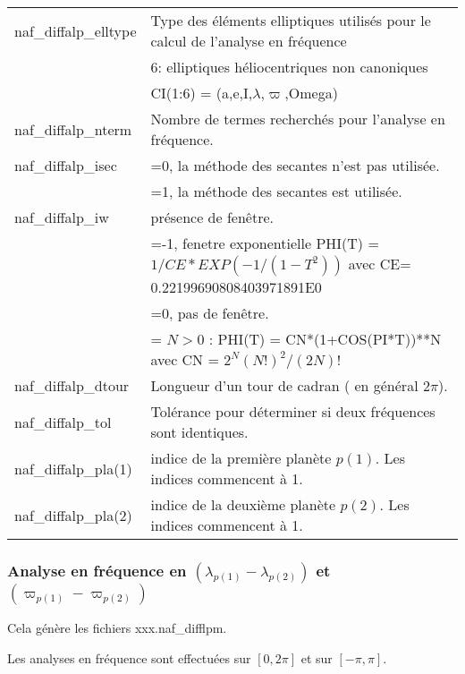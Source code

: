\documentclass[11pt]{article}
\begin{document}
\begin{tabularx}{\textwidth}{|l|X|}
naf\_diffalp\_elltype  & Type des \'el\'ements elliptiques utilis\'es pour le calcul de l'analyse en fr\'equence\\ 
&6:  elliptiques h\'eliocentriques non canoniques\\
&	     CI(1:6) = (a,e,I,$\lambda$,$\varpi$,Omega)\\ \hline
naf\_diffalp\_nterm  & Nombre de termes recherch\'es pour l'analyse en fr\'equence.\\ \hline
naf\_diffalp\_isec  & =0, la m\'ethode des secantes n'est pas utilis\'ee.\\
&=1, la m\'ethode des secantes est utilis\'ee.\\ \hline
naf\_diffalp\_iw  & pr\'esence de fen\^etre.\\
&=-1, fenetre exponentielle PHI(T) = $1/CE*EXP(-1/(1-T^2))$ avec CE= 0.22199690808403971891E0\\
&=0, pas de fen\^etre.\\
&= $N>0$ : PHI(T) = CN*(1+COS(PI*T))**N avec CN = $2^N(N!)^2/(2N)!$\\ \hline
naf\_diffalp\_dtour  & Longueur d'un tour de cadran ( en g\'en\'eral $2\pi$).\\ \hline
naf\_diffalp\_tol  &  Tol\'erance pour d\'eterminer si deux fr\'equences sont identiques.\\ \hline
naf\_diffalp\_pla(1)   & indice de la premi\`ere plan\`ete $p(1)$. Les indices commencent \`a 1.\\ \hline
naf\_diffalp\_pla(2)   & indice de la deuxi\`eme plan\`ete $p(2)$. Les indices commencent \`a  1.\\ \hline

 \end{tabularx}

\vspace{0.5cm}
\subsubsection*{Analyse en fr\'equence en $(\lambda_{p(1)}-\lambda_{p(2)})$ et $(\varpi_{p(1)}-\varpi_{p(2)})$}
Cela g\'en\`ere les fichiers xxx.naf\_difflpm.

Les analyses en fr\'equence sont effectu\'ees sur $[0,2\pi]$ et sur $[-\pi,\pi]$.
\end{document}
